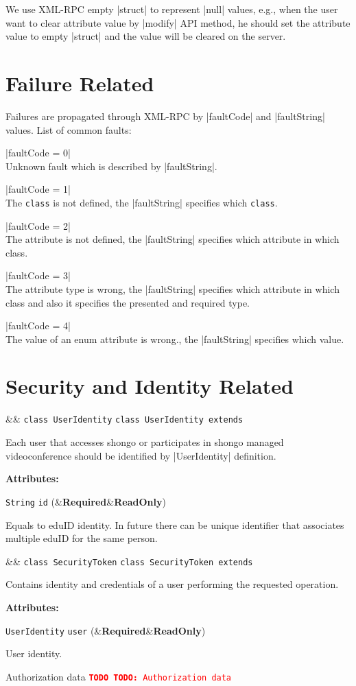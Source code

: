 \documentclass[a4paper]{report}
\newenvironment{Api}{\begin{itemize}}{\end{itemize}}
\newcommand{\ApiCode}[1]{\lstinline[style=styleApi]|#1|}
\newcommand{\ApiValue}[1]{\verb|#1|}
\newcommand{\ApiItem}[1]{\item #1 %

}
\newcommand{\ApiClass}[2]{\ApiItem{%
  \ifx&#2& \ApiCode{class #1} \else \ApiCode{class #1 extends #2} \fi}%
}
\newenvironment{ApiClassAttributes}{%

\begin{samepage}\textbf{Attributes:}\begin{compactitem}}{\end{compactitem}\end{samepage}}
\newcommand{\ApiRequired}{{\color{blue!50!black}\textbf{Required}}}
\newcommand{\ApiReadOnly}{{\color{red!50!black}\textbf{ReadOnly}}}
\newcommand{\ApiClassAttribute}[3]{\ApiItem{\ApiCode{#2} \ApiCode{#1} \hspace{1mm}(\ifx&#3&\ApiReadOnly\else#3\fi)
}}
\newcommand{\TODO}[1]{%
\def\empty{}%
\def\prvniparametr{#1}%
\ifx\prvniparametr\empty%
\begingroup\tt\textcolor{red}{\noindent\textbf{TODO}}\endgroup
\else%
\begingroup\tt\textcolor{red}{\noindent\textbf{TODO:}\ #1}\endgroup
\fi%
}
\begin{document}
We use XML-RPC empty |struct| to represent |null| values, e.g., when the user want to clear attribute value by |modify| API method, he should set the attribute value to empty |struct| and the value will be cleared on the server.


\section{Failure Related}

Failures are propagated through XML-RPC by |faultCode| and |faultString| values. List of common faults:
\begin{compactitem}
\item |faultCode = 0| \\ Unknown fault which is described by |faultString|.
\item |faultCode = 1| \\ The \ApiValue{class} is not defined, the |faultString| specifies which \ApiValue{class}.
\item |faultCode = 2| \\ The attribute is not defined, the |faultString| specifies which attribute in which class.
\item |faultCode = 3| \\ The attribute type is wrong, the |faultString| specifies which attribute in which class and also it specifies the presented and required type.
\item |faultCode = 4| \\ The value of an enum attribute is wrong., the |faultString| specifies which value.
\end{compactitem}


\section{Security and Identity Related}

\begin{Api}

\ApiClass{UserIdentity}{}
Each user that accesses shongo or participates in shongo managed videoconference should be identified by |UserIdentity| definition.
\begin{ApiClassAttributes}
\ApiClassAttribute{id}{String}{\ApiRequired} 
Equals to eduID identity. In future there can be unique identifier that associates multiple eduID for the same person.
\end{ApiClassAttributes}


\ApiClass{SecurityToken}{}
Contains identity and credentials of a user performing the requested operation.
\begin{ApiClassAttributes}
\ApiClassAttribute{user}{UserIdentity}{\ApiRequired} 
User identity.
\item \TODO{Authorization data}
\end{ApiClassAttributes}

\end{Api}
\end{document}
